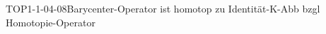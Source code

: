 
\begin{PROP}{TOP1-1-04-08}{Barycenter-Operator ist homotop zu Identität-K-Abb bzgl Homotopie-Operator}
\end{PROP}
